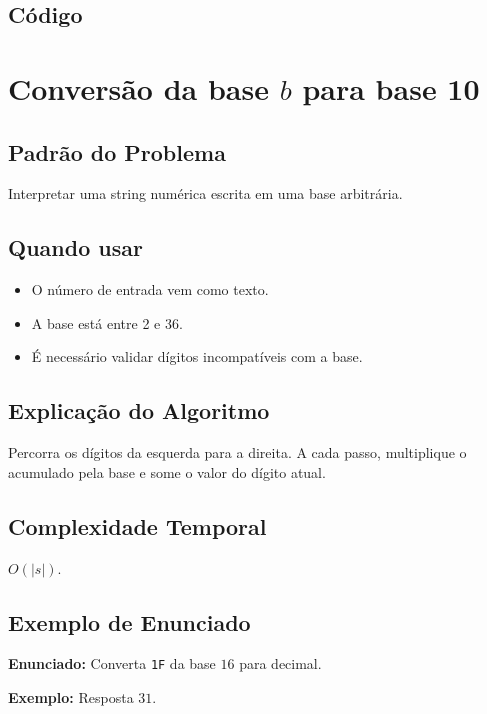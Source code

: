 \subsection{Código}

\section{Conversão da base $b$ para base 10}

\subsection{Padrão do Problema}
Interpretar uma string numérica escrita em uma base arbitrária.

\subsection{Quando usar}
\begin{itemize}[nosep]
  \item O número de entrada vem como texto.
  \item A base está entre 2 e 36.
  \item É necessário validar dígitos incompatíveis com a base.
\end{itemize}

\subsection{Explicação do Algoritmo}
Percorra os dígitos da esquerda para a direita. A cada passo, multiplique o acumulado pela base e some o valor do dígito atual.

\subsection{Complexidade Temporal}
$O(|s|)$.

\subsection{Exemplo de Enunciado}
\begin{exemplodiabox}
\textbf{Enunciado:} Converta \texttt{1F} da base $16$ para decimal.

\textbf{Exemplo:} Resposta $31$.
\end{exemplodiabox}

